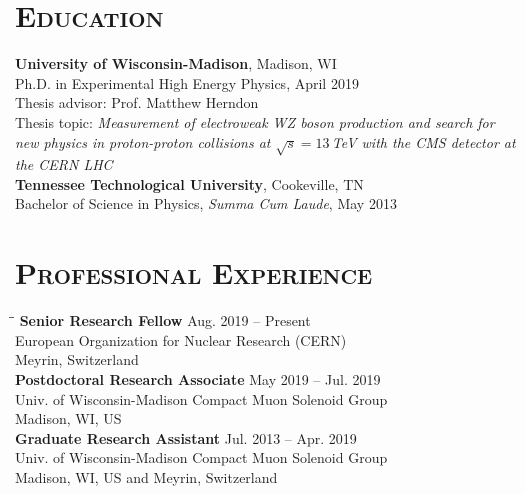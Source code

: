 \documentclass[10pt]{res} %
\begin{document}

\address{{\bf Current Address} \\  CERN B40/2-A20 \\  Geneva 23 \\ Switzerland \\ Tel: +41 77 501 95 13 }
\address{}

\begin{resume}
\section{\textsc{Education}}
  \textbf{University of Wisconsin-Madison}, Madison, WI \\
Ph.D. in Experimental High Energy Physics, April 2019 \\
  Thesis advisor: Prof. Matthew Herndon \\
    Thesis topic: \emph{Measurement of electroweak WZ boson production and search for new physics in proton-proton collisions at $\sqrt{s}=13$\,TeV with the CMS detector at the CERN LHC} \\
  \textbf{Tennessee Technological University}, Cookeville, TN \\
Bachelor of Science in Physics, \textit{Summa Cum Laude}, May 2013

\section{\textsc{Professional Experience}}
\vspace{-0.1in}
\begin{tabbing}
\hspace{2.3in}\= \hspace{2.4in}\= \kill %
{\bf Senior Research Fellow} \>\> Aug. 2019 -- Present \\
European Organization for Nuclear Research (CERN)   \\  Meyrin, Switzerland \\
{\bf Postdoctoral Research Associate} \>\> May 2019 -- Jul. 2019\\
Univ. of Wisconsin-Madison Compact Muon Solenoid Group \\  Madison, WI, US \\
{\bf Graduate Research Assistant} \>\> Jul. 2013 -- Apr. 2019\\
Univ. of Wisconsin-Madison Compact Muon Solenoid Group \\  Madison, WI, US and Meyrin, Switzerland \\
\end{tabbing}\vspace{-20pt}      %


\end{resume}
\end{document}
